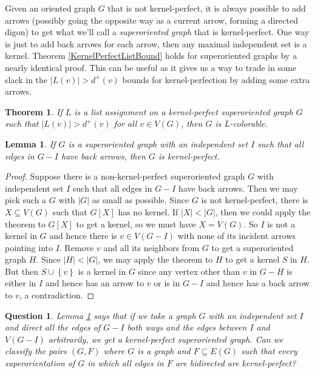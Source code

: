 \documentclass[openany]{tufte-book} %
\theoremstyle{plain}
\newtheorem{lemma}{Lemma}
\newtheorem{question}{Question}
\newtheorem{theorem}{Theorem}
\newcommand{\set}[1]{\left\{ #1 \right\}}
\newcommand{\card}[1]{\left|#1\right|}
\begin{document}
Given an oriented graph $G$ that is not kernel-perfect, it is always possible to add arrows (possibly going the opposite way as a current arrow, forming a directed digon) 
to get what we'll call a \emph{superoriented graph} that is kernel-perfect.  One way is just to add back arrows for each arrow, then any maximal independent set is a kernel.
Theorem \ref{KernelPerfectListBound} holds for superoriented graphs by a nearly identical proof.  
This can be useful as it gives us a way to trade in some slack in the $\card{L(v)} > d^+(v)$ bounds for kernel-perfection by adding some extra arrows.\marginnote{\textcolor{blue}{example, picture}}

\begin{theorem}\label{KernelPerfectSuperListBound}
If $L$ is a list assignment on a kernel-perfect superoriented graph $G$ such that $\card{L(v)} > d^+(v)$ for all $v \in V(G)$, then $G$ is $L$-colorable.
\end{theorem}

\begin{lemma}\label{KostochkaYanceyKernelLemma}
If $G$ is a superoriented graph with an independent set $I$ such that all edges in $G-I$ have back arrows, then $G$ is kernel-perfect.
\end{lemma}
\begin{proof}
Suppose there is a non-kernel-perfect superoriented graph $G$ with independent set $I$ such that all edges in $G-I$ have back arrows.  Then we may pick such a $G$ with $\card{G}$
as small as possible.  Since $G$ is not kernel-perfect, there is $X \subseteq V(G)$ such that $G[X]$ has no kernel.  If $\card{X} < \card{G}$, 
then we could apply the theorem to $G[X]$ to get a kernel, so we must have $X = V(G)$.  So $I$ is not a kernel in $G$ and hence there is $v \in V(G-I)$ 
with none of its incident arrows pointing into $I$.  Remove $v$ and all its neighbors from $G$ to get a superoriented graph $H$. Since $\card{H} < \card{G}$, we may apply the
theorem to $H$ to get a kernel $S$ in $H$.  But then $S \cup \set{v}$ is a kernel in $G$ since any vertex other than $v$ in $G-H$ is either in $I$ and hence 
has an arrow to $v$ or is in $G-I$ and hence has a back arrow to $v$, a contradiction.
\end{proof}

\begin{question}
Lemma \ref{KostochkaYanceyKernelLemma} says that if we take a graph $G$ with an independent set $I$ and direct all the edges of $G-I$ both ways and the edges 
between $I$ and $V(G-I)$ arbitrarily, we get a kernel-perfect superoriented graph.  Can we classify the pairs $(G, F)$ where $G$ is a graph and $F \subseteq E(G)$ such that
every superorientation of $G$ in which all edges in $F$ are bidirected are kernel-perfect?  \marginnote{\textcolor{blue}{examples}}
\end{question}
\end{document}
